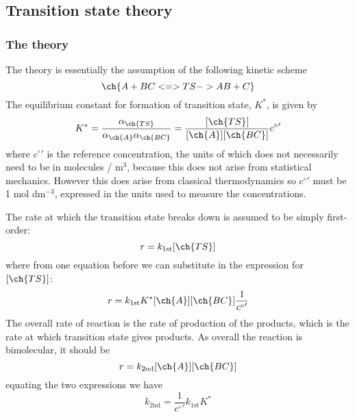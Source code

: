 \subsection{Transition state theory}
\subsubsection{The theory}
The theory is essentially the assumption of the following kinetic scheme
\begin{equation*}
  \ch{A + BC <=> TS -> AB + C}
\end{equation*}
The equilibrium constant for formation of transition state, $K^{*}$, is given by
\begin{equation}
  K^{*}=\frac{\alpha_{\ch{TS}}}{\alpha_{\ch{A}}\alpha_{\ch{BC}}}=\frac{[\ch{TS}]}{[\ch{A}][\ch{BC}]}{c^{\circ}}'
\end{equation}
where ${c^{\circ}}'$ is the reference concentration, the units of which does not necessarily need to be in molecules / m$^3$, because this does not arise from statistical mechanics. However this does arise from classical thermodynamics so ${c^{\circ}}'$ must be 1 mol dm$^{-3}$, expressed in the units used to measure the concentrations.\par
The rate at which the transition state breaks down is assumed to be simply first-order:
\begin{equation}
  r=k_{\text{1st}}[\ch{TS}]
\end{equation}
where from one equation before we can substitute in the expression for $[\ch{TS}]$:
\begin{equation}
  r=k_{\text{1st}}K^{*}[\ch{A}][\ch{BC}]\frac{1}{{c^{\circ}}'}
\end{equation}
The overall rate of reaction is the rate of production of the products, which is the rate at which transition state gives products. As overall the reaction is bimolecular, it should be
\begin{equation}
  r=k_{\text{2nd}}[\ch{A}][\ch{BC}]
\end{equation}
equating the two expressions we have
\begin{equation}
  k_{\text{2nd}}=\frac{1}{{c^{\circ}}'}k_{\text{1st}}K^*
\end{equation}
